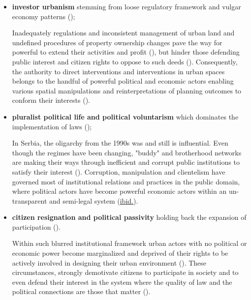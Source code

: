 \documentclass[11pt]{report}
\begin{document}
\begin{itemize}
\item \textbf{investor urbanism} stemming from loose regulatory framework and vulgar economy patterns (\citealt{Vujosevic 2010});

Inadequately regulations and inconsistent management of urban land and undefined procedures of property ownership  changes pave the way for powerful to extend their activities and profit (\citealt{ref}), but hinder those defending public interest and citizen rights to oppose to such deeds (\citealt{Vujovic et al. 2007}).
Consequently, the authority to direct interventions and interventions in urban spaces belongs to the handful of powerful political and economic actors enabling various spatial manipulations and reinterpretations of planning outcomes to conform their interests (\href{Van}{\citealt{van_assche_co-evolutions_2013}}).

\item \textbf{pluralist political life and political voluntarism} which dominates the implementation of laws (\citealt{Djokic et al. 2007});

In Serbia, the oligarchy from the 1990s was and still is influential. Even though the regimes have been changing, "buddy" and brotherhood networks are making their ways through inefficient and corrupt public institutions to satisfy their interest (\href{Vujovic}{\citealt{vujovic_belgrades_2007}}).
Corruption, manipulation and clientelism have governed most of institutional relations and practices in the 
public domain, where political actors have become powerful economic actors within an un-transparent and 
semi-legal system (\href{Vujovic}{ibid.}).

\item \textbf{citizen resignation and political passivity} holding back the expansion of participation (\citealt{Vujovic et al. 2007}). 

Within such blurred institutional framework urban actors with no political or economic power become marginalized and deprived of their rights to be actively involved in designing their urban environment (\citealt{Bolay et al. 2005}).
These circumstances, strongly demotivate citizens to participate in society and to even defend their interest in the system where the quality of law and the political connections are those that matter (\href{Vujovic}{\citealt{vujovic_belgrades_2007}}).
\end{itemize}
\end{document}
